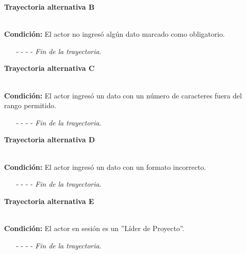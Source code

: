 \hypertarget{CU12-5:TAB}{\textbf{Trayectoria alternativa B}}\\
\noindent \textbf{Condición:} El actor no ingresó algún dato marcado como obligatorio.
\begin{enumerate}
	\UCpaso[\UCsist] Muestra el mensaje  señalando el campo que presenta el error en la pantalla .
	\UCpaso Regresa al paso \ref{CU12.5-P5} de la trayectoria principal o al paso \ref{CU12.5-TAP2} de la trayectoria alternativa A.
	\item[- -] - - {\em {Fin de la trayectoria}}.%
\end{enumerate}
\hypertarget{CU12-5:TAC}{\textbf{Trayectoria alternativa C}}\\
\noindent \textbf{Condición:} El actor ingresó un dato con un número de caracteres fuera del rango permitido.
\begin{enumerate}
	\UCpaso[\UCsist] Muestra el mensaje  señalando el campo que presenta el error en la pantalla .
	\UCpaso Regresa al paso \ref{CU12.5-P5} de la trayectoria principal o al paso \ref{CU12.5-TAP2} de la trayectoria alternativa A.
	\item[- -] - - {\em {Fin de la trayectoria}}.%
\end{enumerate}
\hypertarget{CU12-5:TAD}{\textbf{Trayectoria alternativa D}}\\
\noindent \textbf{Condición:} El actor ingresó un dato con un formato incorrecto.
\begin{enumerate}
	\UCpaso[\UCsist] Muestra el mensaje  señalando el campo que presenta el error en la pantalla .
	\UCpaso Regresa al paso \ref{CU12.5-P5} de la trayectoria principal o al paso \ref{CU12.5-TAP2} de la trayectoria alternativa A.
	\item[- -] - - {\em {Fin de la trayectoria}}.
\end{enumerate}
\hypertarget{CU12-5:TAE}{\textbf{Trayectoria alternativa E}}\\
\noindent \textbf{Condición:} El actor en sesión es un ''Líder de Proyecto''.
\begin{enumerate}
	\UCpaso[\UCsist] Cambia el estado del caso de uso a ''Liberado''.
	\UCpaso Continúa en el paso \ref{CU12.5-P12} de la trayectoria principal.
	\item[- -] - - {\em {Fin de la trayectoria}}.
\end{enumerate}
